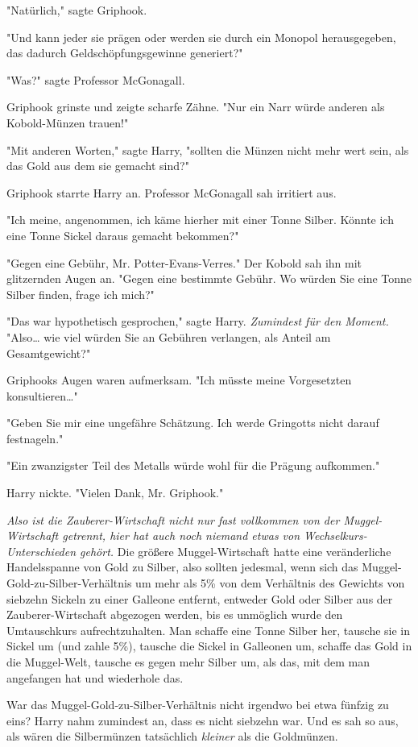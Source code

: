 {"Natürlich," sagte Griphook.

"Und kann jeder sie prägen oder werden sie durch ein Monopol herausgegeben, das dadurch Geldschöpfungsgewinne generiert?"

"Was?" sagte Professor McGonagall.

Griphook grinste und zeigte scharfe Zähne. "Nur ein Narr würde anderen als Kobold-Münzen trauen!"

"Mit anderen Worten," sagte Harry, "sollten die Münzen nicht mehr wert sein, als das Gold aus dem sie gemacht sind?"

Griphook starrte Harry an. Professor McGonagall sah irritiert aus.

"Ich meine, angenommen, ich käme hierher mit einer Tonne Silber. Könnte ich eine Tonne Sickel daraus gemacht bekommen?"

"Gegen eine Gebühr, Mr. Potter-Evans-Verres." Der Kobold sah ihn mit glitzernden Augen an. "Gegen eine bestimmte Gebühr. Wo würden Sie eine Tonne Silber finden, frage ich mich?"

"Das war hypothetisch gesprochen," sagte Harry. \emph{Zumindest für den Moment.} "Also… wie viel würden Sie an Gebühren verlangen, als Anteil am Gesamtgewicht?"

Griphooks Augen waren aufmerksam. "Ich müsste meine Vorgesetzten konsultieren…"

"Geben Sie mir eine ungefähre Schätzung. Ich werde Gringotts nicht darauf festnageln."

"Ein zwanzigster Teil des Metalls würde wohl für die Prägung aufkommen."

Harry nickte. "Vielen Dank, Mr. Griphook."

\emph{Also ist die Zauberer-Wirtschaft nicht nur fast vollkommen von der Muggel-Wirtschaft getrennt, hier hat auch noch niemand etwas von Wechselkurs-Unterschieden gehört.} Die größere Muggel-Wirtschaft hatte eine veränderliche Handelsspanne von Gold zu Silber, also sollten jedesmal, wenn sich das Muggel-Gold-zu-Silber-Verhältnis um mehr als 5\% von dem Verhältnis des Gewichts von siebzehn Sickeln zu einer Galleone entfernt, entweder Gold oder Silber aus der Zauberer-Wirtschaft abgezogen werden, bis es unmöglich wurde den Umtauschkurs aufrechtzuhalten. Man schaffe eine Tonne Silber her, tausche sie in Sickel um (und zahle 5\%), tausche die Sickel in Galleonen um, schaffe das Gold in die Muggel-Welt, tausche es gegen mehr Silber um, als das, mit dem man angefangen hat und wiederhole das.

War das Muggel-Gold-zu-Silber-Verhältnis nicht irgendwo bei etwa fünfzig zu eins? Harry nahm zumindest an, dass es nicht siebzehn war. Und es sah so aus, als wären die Silbermünzen tatsächlich \emph{kleiner} als die Goldmünzen.

}

